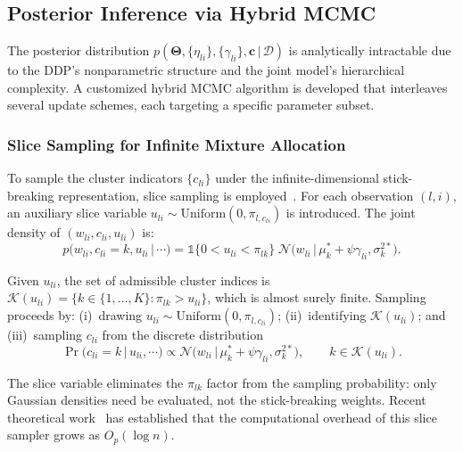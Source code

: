 \documentclass[a4paper,fleqn,longmktitle]{cas-sc}
\newcommand{\given}{\,|\,}
\newcommand{\normal}{\mathcal{N}}
\begin{document}
\subsection{Posterior Inference via Hybrid MCMC}
\label{sec:mcmc}

The posterior distribution $p(\bm{\Theta}, \{\eta_{li}\}, \{\gamma_{li}\}, \bm{c} \given \mathcal{D})$ is analytically intractable due to the DDP's nonparametric structure and the joint model's hierarchical complexity. A customized hybrid MCMC algorithm is developed that interleaves several update schemes, each targeting a specific parameter subset.

\subsubsection{Slice Sampling for Infinite Mixture Allocation}

To sample the cluster indicators $\{c_{li}\}$ under the infinite-dimensional stick-breaking representation, slice sampling is employed~\cite{Neal2003,Walker2007}. For each observation $(l,i)$, an auxiliary slice variable $u_{li} \sim \text{Uniform}(0, \pi_{l, c_{li}})$ is introduced. The joint density of $(w_{li}, c_{li}, u_{li})$ is:
\begin{equation}\label{eq:slice_joint}
    p(w_{li}, c_{li} = k, u_{li} \given \cdots) =
    \mathbb{1}\{0 < u_{li} < \pi_{lk}\} \;
    \normal\!\bigl(w_{li} \given \mu_k^* + \psi\gamma_{li}, \sigma_k^{2*}\bigr).
\end{equation}

Given $u_{li}$, the set of admissible cluster indices is $\mathcal{K}(u_{li}) = \{k \in \{1,\ldots,K\} : \pi_{lk} > u_{li}\}$, which is almost surely finite. Sampling proceeds by: (i)~drawing $u_{li} \sim \text{Uniform}(0, \pi_{l, c_{li}})$; (ii)~identifying $\mathcal{K}(u_{li})$; and (iii)~sampling $c_{li}$ from the discrete distribution
\begin{equation}\label{eq:slice_prob}
    \Pr(c_{li} = k \given u_{li}, \cdots) \propto
    \normal\!\bigl(w_{li} \given \mu_k^* + \psi\gamma_{li}, \sigma_k^{2*}\bigr), \qquad k \in \mathcal{K}(u_{li}).
\end{equation}

The slice variable eliminates the $\pi_{lk}$ factor from the sampling probability: only Gaussian densities need be evaluated, not the stick-breaking weights. Recent theoretical work~\cite{Franzolini2025} has established that the computational overhead of this slice sampler grows as $O_p(\log n)$.
\end{document}
